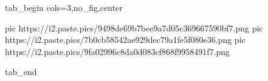  
 
 
 
 


\ifcmt
  tab_begin cols=3,no_fig,center

     pic https://i2.paste.pics/9498de69b7bee9a7d05c369667590bf7.png
		 pic https://i2.paste.pics/7b0cb58542ae929dec79a1fe5f080e36.png
		 pic https://i2.paste.pics/9fa02996c8da0d083cf868f9958491f7.png

  tab_end
\fi
